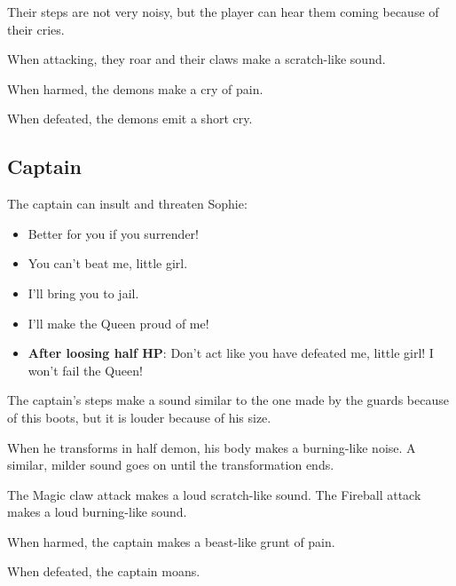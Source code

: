 Their steps are not very noisy, but the player can hear them coming because of their cries.

When attacking, they roar and their claws make a scratch-like sound.

When harmed, the demons make a cry of pain.

When defeated, the demons emit a short cry.

\subsection{Captain}
The captain can insult and threaten Sophie:

\begin{itemize}
	\item Better for you if you surrender!
	\item You can't beat me, little girl.
	\item I'll bring you to jail.
	\item I'll make the Queen proud of me!
	\item \textbf{After loosing half HP}: Don't act like you have defeated me, little girl! I won't fail the Queen!
\end{itemize}

The captain's steps make a sound similar to the one made by the guards because of this boots, but it is louder because of his size.

When he transforms in half demon, his body makes a burning-like noise. A similar, milder sound goes on until the transformation ends.

The Magic claw attack makes a loud scratch-like sound. The Fireball attack makes a loud burning-like sound.

When harmed, the captain makes a beast-like grunt of pain.

When defeated, the captain moans.
